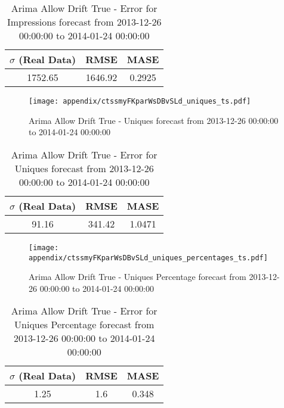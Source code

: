 \begin{table}[H]
\centering
\footnotesize
\begin{tabular}{ccc}
$\sigma$ (Real Data) & RMSE & MASE   \\ \hline
1752.65 & 1646.92 & 0.2925 \\
\end{tabular}

\vspace{0.5cm}

\caption[]{
Arima Allow Drift True - Error for Impressions forecast from 2013-12-26 00:00:00 to 2014-01-24 00:00:00}
\end{table}

\begin{figure}[H] \begin{center} \leavevmode
\texttt{[image: appendix/ctssmyFKparWsDBvSLd\_uniques\_ts.pdf]} \caption[]{
Arima Allow Drift True - Uniques forecast from 2013-12-26 00:00:00 to 2014-01-24 00:00:00} \label{fig:appendix/ctssmyFKparWsDBvSLd_uniques_ts.pdf} \end{center}
\end{figure}

\begin{table}[H]
\centering
\footnotesize
\begin{tabular}{ccc}
$\sigma$ (Real Data) & RMSE & MASE   \\ \hline
91.16 & 341.42 & 1.0471 \\
\end{tabular}

\vspace{0.5cm}

\caption[]{
Arima Allow Drift True - Error for Uniques forecast from 2013-12-26 00:00:00 to 2014-01-24 00:00:00}
\end{table}

\begin{figure}[H] \begin{center} \leavevmode
\texttt{[image: appendix/ctssmyFKparWsDBvSLd\_uniques\_percentages\_ts.pdf]} \caption[]{
Arima Allow Drift True - Uniques Percentage forecast from 2013-12-26 00:00:00 to 2014-01-24 00:00:00} \label{fig:appendix/ctssmyFKparWsDBvSLd_uniques_percentages_ts.pdf} \end{center}
\end{figure}

\begin{table}[H]
\centering
\footnotesize
\begin{tabular}{ccc}
$\sigma$ (Real Data) & RMSE & MASE   \\ \hline
1.25 & 1.6 & 0.348 \\
\end{tabular}

\vspace{0.5cm}

\caption[]{
Arima Allow Drift True - Error for Uniques Percentage forecast from 2013-12-26 00:00:00 to 2014-01-24 00:00:00}
\end{table}

